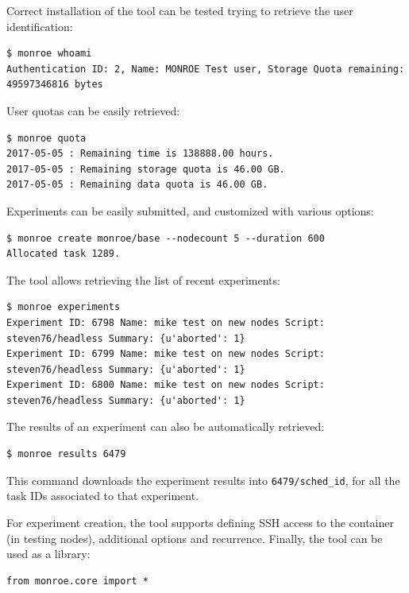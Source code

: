 \documentclass[a4paper,10pt]{article}
\newcommand{\VerbatimFont}{\footnotesize}
\newcommand{\identifier}[1]{{\texttt{\small{#1}}}}
\begin{document}
\noindent Correct installation of the tool can be tested trying to retrieve the user identification:
{\VerbatimFont\begin{verbatim}
$ monroe whoami
Authentication ID: 2, Name: MONROE Test user, Storage Quota remaining: 49597346816 bytes
\end{verbatim}}

\noindent User quotas can be easily retrieved:
{\VerbatimFont\begin{verbatim}
$ monroe quota
2017-05-05 : Remaining time is 138888.00 hours.
2017-05-05 : Remaining storage quota is 46.00 GB.
2017-05-05 : Remaining data quota is 46.00 GB.
\end{verbatim}}

\noindent Experiments can be easily submitted, and customized with various options:
{\VerbatimFont\begin{verbatim}
$ monroe create monroe/base --nodecount 5 --duration 600
Allocated task 1289.
\end{verbatim}}

\noindent The tool allows retrieving the list of recent experiments:
{\VerbatimFont\begin{verbatim}
$ monroe experiments
Experiment ID: 6798 Name: mike test on new nodes Script: steven76/headless Summary: {u'aborted': 1}
Experiment ID: 6799 Name: mike test on new nodes Script: steven76/headless Summary: {u'aborted': 1}
Experiment ID: 6800 Name: mike test on new nodes Script: steven76/headless Summary: {u'aborted': 1}
\end{verbatim}}

\noindent The results of an experiment can also be automatically retrieved:
{\VerbatimFont\begin{verbatim}
$ monroe results 6479
\end{verbatim}}
\noindent This command downloads the experiment results into \identifier{6479/sched\_id}, for all the task IDs associated to that experiment.

For experiment creation, the tool supports defining SSH access to the container (in testing nodes), additional options and recurrence.
Finally, the tool can be used as a library:
{\VerbatimFont\begin{verbatim}
from monroe.core import *
\end{verbatim}}


\end{document}
